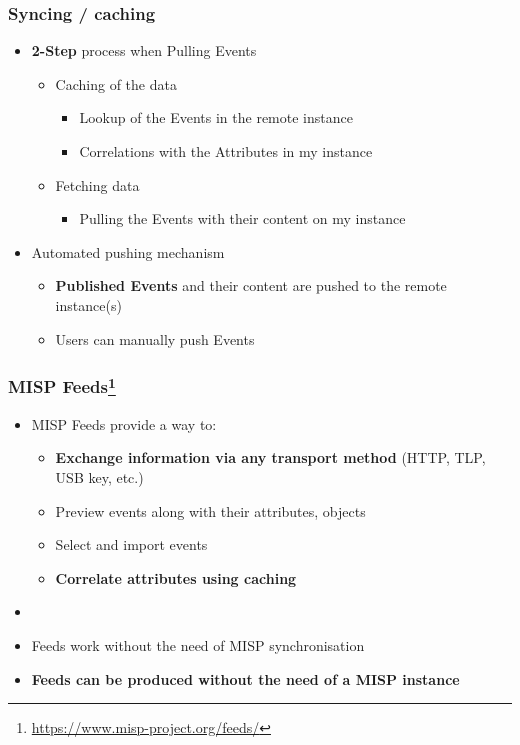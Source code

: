 \begin{frame}
    \frametitle{Syncing / caching}
    \begin{itemize}
        \item \textbf{2-Step} process when Pulling Events
        \begin{itemize}
            \item Caching of the data
            \begin{itemize}
                \item Lookup of the Events in the remote instance
                \item Correlations with the Attributes in my instance
            \end{itemize}
            \item Fetching data
            \begin{itemize}
                \item Pulling the Events with their content on my instance
            \end{itemize}
        \end{itemize}
        \item Automated pushing mechanism
        \begin{itemize}
            \item \textbf{Published Events} and their content are pushed to the remote instance(s)
            \item Users can manually push Events
        \end{itemize}
    \end{itemize}
\end{frame}

\begin{frame}
    \frametitle{MISP Feeds\footnote{\url{https://www.misp-project.org/feeds/}}}
    \begin{itemize}
        \item MISP Feeds provide a way to:
        \begin{itemize}
            \item \textbf{Exchange information via any transport method} (HTTP, TLP, USB key, etc.)
            \item Preview events along with their attributes, objects
            \item Select and import events
            \item \textbf{Correlate attributes using caching}
        \end{itemize}
        \item []
        \item Feeds work without the need of MISP synchronisation
        \item \textbf{Feeds can be produced without the need of a MISP instance}
    \end{itemize}
\end{frame}

